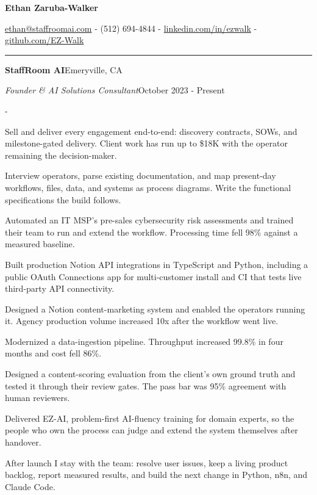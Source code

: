 \documentclass[10pt,letterpaper]{article}
\newenvironment{cvitems}{%
  \begin{list}{-}{%
    \setlength{\leftmargin}{12pt}%
    \setlength{\itemsep}{1.2pt}%
    \setlength{\parsep}{0pt}%
    \setlength{\topsep}{1.5pt}%
    \setlength{\partopsep}{0pt}%
    \setlength{\labelwidth}{6pt}%
    \setlength{\labelsep}{6pt}%
    \setlength{\itemindent}{0pt}%
  }%
}{\end{list}}
\newcommand{\cvsection}[1]{%
  \vspace{7pt}%
  \noindent{\bfseries\fontsize{11pt}{13pt}\selectfont\MakeUppercase{#1}}\par
  \vspace{1pt}%
  \noindent\rule{\textwidth}{0.4pt}\par
  \vspace{4pt}%
}
\newcommand{\cventryhead}[4]{%
  \noindent\textbf{#1}\hfill#2\par
  \vspace{0.5pt}%
  \noindent\textit{#3}\hfill#4\par
}
\begin{document}
\begin{center}
  {\bfseries\fontsize{22pt}{24pt}\selectfont Ethan Zaruba-Walker\par}
  \vspace{4pt}
  {\fontsize{10pt}{12pt}\selectfont
    \href{mailto:ethan@staffroomai.com}{ethan@staffroomai.com}
    {-}
    (512) 694-4844
    {-}
    \href{https://linkedin.com/in/ezwalk}{linkedin.com/in/ezwalk}
    {-}
    \href{https://github.com/EZ-Walk}{github.com/EZ-Walk}\par}
\end{center}
\vspace{2pt}

\cvsection{Experience}

\cventryhead{StaffRoom AI}{Emeryville, CA}
{Founder \& AI Solutions Consultant}{October 2023 - Present}
\begin{cvitems}
  \item Sell and deliver every engagement end-to-end: discovery contracts, SOWs, and milestone-gated delivery. Client work has run up to \$18K with the operator remaining the decision-maker.
  \item Interview operators, parse existing documentation, and map present-day workflows, files, data, and systems as process diagrams. Write the functional specifications the build follows.
  \item Automated an IT MSP's pre-sales cybersecurity risk assessments and trained their team to run and extend the workflow. Processing time fell 98\% against a measured baseline.
  \item Built production Notion API integrations in TypeScript and Python, including a public OAuth Connections app for multi-customer install and CI that tests live third-party API connectivity.
  \item Designed a Notion content-marketing system and enabled the operators running it. Agency production volume increased 10x after the workflow went live.
  \item Modernized a data-ingestion pipeline. Throughput increased 99.8\% in four months and cost fell 86\%.
  \item Designed a content-scoring evaluation from the client's own ground truth and tested it through their review gates. The pass bar was 95\% agreement with human reviewers.
  \item Delivered EZ-AI, problem-first AI-fluency training for domain experts, so the people who own the process can judge and extend the system themselves after handover.
  \item After launch I stay with the team: resolve user issues, keep a living product backlog, report measured results, and build the next change in Python, n8n, and Claude Code.
\end{cvitems}
\end{document}
